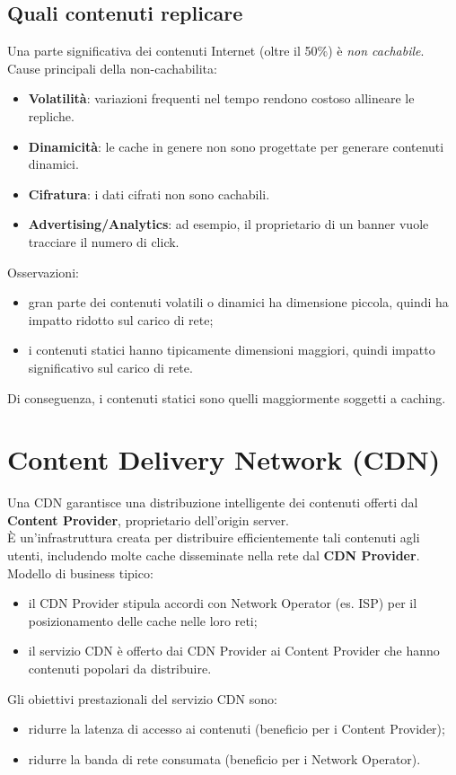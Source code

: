 \subsection{Quali contenuti replicare}
Una parte significativa dei contenuti Internet (oltre il 50\%) è \emph{non cachabile}.
\\
Cause principali della non-cachabilita:
\begin{itemize}
	\item \textbf{Volatilità}: variazioni frequenti nel tempo rendono costoso allineare le repliche.
	\item \textbf{Dinamicità}: le cache in genere non sono progettate per generare contenuti dinamici.
	\item \textbf{Cifratura}: i dati cifrati non sono cachabili.
	\item \textbf{Advertising/Analytics}: ad esempio, il proprietario di un banner vuole tracciare il numero di click.
\end{itemize}
\noindent
Osservazioni:
\begin{itemize}
	\item gran parte dei contenuti volatili o dinamici ha dimensione piccola, quindi ha impatto ridotto sul carico di rete;
	\item i contenuti statici hanno tipicamente dimensioni maggiori, quindi impatto significativo sul carico di rete.
\end{itemize}
\noindent
Di conseguenza, i contenuti statici sono quelli maggiormente soggetti a caching.
\section{Content Delivery Network (CDN)}
Una CDN garantisce una distribuzione intelligente dei contenuti offerti dal \textbf{Content Provider}, proprietario dell'origin server.
\\
È un'infrastruttura creata per distribuire efficientemente tali contenuti agli utenti, includendo molte cache disseminate nella rete dal \textbf{CDN Provider}.
\\
Modello di business tipico:
\begin{itemize}
	\item il CDN Provider stipula accordi con Network Operator (es. ISP) per il posizionamento delle cache nelle loro reti;
	\item il servizio CDN è offerto dai CDN Provider ai Content Provider che hanno contenuti popolari da distribuire.
\end{itemize}
\noindent
Gli obiettivi prestazionali del servizio CDN sono:
\begin{itemize}
	\item ridurre la latenza di accesso ai contenuti (beneficio per i Content Provider);
	\item ridurre la banda di rete consumata (beneficio per i Network Operator).
\end{itemize}

